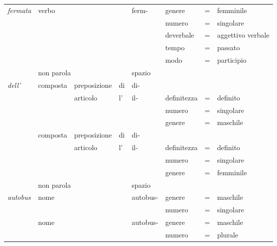 \documentclass[twoside,stylearticle,11pt,filologia,it,article,bibsection]{spinoza}
\newcommand\spzradtema[1]{#1-}
\begin{document}
{\begin{scriptsize}
\begin{tabular}{>{\it}l|l|ll|l|lll|}
\hline
fermata &\multicolumn{3}{l|}{verbo}&	ferm- &genere&=&femminile\\
      &\multicolumn{3}{l|}{}&&numero&=&singolare\\
      &\multicolumn{3}{l|}{}&&deverbale&=&aggettivo verbale\\
      &\multicolumn{3}{l|}{}&&tempo&=&passato\\
      &\multicolumn{3}{l|}{}&&modo&=&participio\\
\hline
 &\multicolumn{3}{l|}{non parola}&\multicolumn{4}{l|}{spazio}\\
\hline
dell'&composta&preposizione&di&\spzradtema{di} &&&\\
\cline{3-8}
&&articolo&l'&\spzradtema{il}& definitezza&=&definito\\
      &&&&& numero&=&singolare\\
      &&&&& genere&=&maschile \\
\cline{2-8}
&composta &preposizione&di&\spzradtema{di}&&&\\
\cline{3-8}
&&articolo&l'&\spzradtema{il}& definitezza&=&definito\\
      &&&&& numero&=&singolare\\
      &&&&& genere&=&femminile \\
\hline
 &\multicolumn{3}{l|}{non parola}&\multicolumn{4}{l|}{spazio}\\
\hline
autobus &\multicolumn{3}{l|}{nome}&autobus-&genere&=&maschile\\
      &\multicolumn{3}{l|}{}&&numero&=&singolare\\
\cline{2-8}
      &\multicolumn{3}{l|}{nome}&autobus-&genere&=&maschile\\
      &\multicolumn{3}{l|}{}&&numero&=&plurale\\
\hline
\end{tabular}\end{scriptsize}}

\afterpage\clearpage




\nocite{longo2012}
\nocite{chomsky1965}
\nocite{chomsky2002}
\nocite{albano1997}

\startbiblio


\tableofcontents
\end{document}
